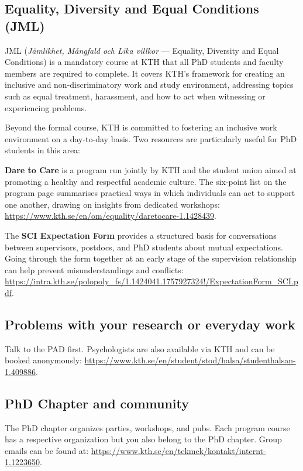 \documentclass{article}
\begin{document}
\subsection{Equality, Diversity and Equal Conditions (JML)}
JML (\textit{Jämlikhet, Mångfald och Lika villkor} — Equality, Diversity and Equal Conditions) is a mandatory course at KTH that all PhD students and faculty members are required to complete. It covers KTH's framework for creating an inclusive and non-discriminatory work and study environment, addressing topics such as equal treatment, harassment, and how to act when witnessing or experiencing problems.

Beyond the formal course, KTH is committed to fostering an inclusive work environment on a day-to-day basis. Two resources are particularly useful for PhD students in this area:

\textbf{Dare to Care} is a program run jointly by KTH and the student union aimed at promoting a healthy and respectful academic culture. The six-point list on the program page summarises practical ways in which individuals can act to support one another, drawing on insights from dedicated workshops: \url{https://www.kth.se/en/om/equality/daretocare-1.1428439}.

The \textbf{SCI Expectation Form} provides a structured basis for conversations between supervisors, postdocs, and PhD students about mutual expectations. Going through the form together at an early stage of the supervision relationship can help prevent misunderstandings and conflicts: \url{https://intra.kth.se/polopoly_fs/1.1424041.1757927324!/ExpectationForm_SCI.pdf}.

\subsection{Problems with your research or everyday work}
Talk to the PAD first. Psychologists are also available via KTH and can be booked anonymously: \url{https://www.kth.se/en/student/stod/halsa/studenthalsan-1.409886}.

\subsection{PhD Chapter and community}
The PhD chapter organizes parties, workshops, and pubs. Each program course has a respective organization but you also belong to the PhD chapter.
Group emails can be found at: \url{https://www.kth.se/en/tekmek/kontakt/internt-1.1223650}.
\end{document}
